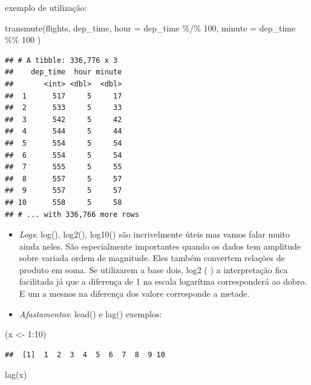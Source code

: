 \documentclass[
]{article}
\newenvironment{Shaded}{\begin{snugshade}}{\end{snugshade}}
\newcommand{\AttributeTok}[1]{\textcolor[rgb]{0.77,0.63,0.00}{#1}}
\newcommand{\DecValTok}[1]{\textcolor[rgb]{0.00,0.00,0.81}{#1}}
\newcommand{\FunctionTok}[1]{\textcolor[rgb]{0.00,0.00,0.00}{#1}}
\newcommand{\NormalTok}[1]{#1}
\newcommand{\OtherTok}[1]{\textcolor[rgb]{0.56,0.35,0.01}{#1}}
\newcommand{\SpecialCharTok}[1]{\textcolor[rgb]{0.00,0.00,0.00}{#1}}
\begin{document}
exemplo de utilização:

\begin{Shaded}
\begin{Highlighting}[]
\FunctionTok{transmute}\NormalTok{(flights,}
\NormalTok{  dep\_time,}
  \AttributeTok{hour =}\NormalTok{ dep\_time }\SpecialCharTok{\%/\%} \DecValTok{100}\NormalTok{,}
  \AttributeTok{minute =}\NormalTok{ dep\_time }\SpecialCharTok{\%\%} \DecValTok{100}
\NormalTok{)}
\end{Highlighting}
\end{Shaded}

\begin{verbatim}
## # A tibble: 336,776 x 3
##    dep_time  hour minute
##       <int> <dbl>  <dbl>
##  1      517     5     17
##  2      533     5     33
##  3      542     5     42
##  4      544     5     44
##  5      554     5     54
##  6      554     5     54
##  7      555     5     55
##  8      557     5     57
##  9      557     5     57
## 10      558     5     58
## # ... with 336,766 more rows
\end{verbatim}

\begin{itemize}
\item
  \emph{Logs}: log(), log2(), log10() são incrivelmente úteis mas vamos
  falar muito ainda neles. São especialmente importantes quando os dados
  tem amplitude sobre variada ordem de magnitude. Eles também convertem
  relações de produto em soma. Se utilizarem a base dois, log2 ( ) a
  interpretação fica facilitada já que a diferença de 1 na escala
  logarítma corresponderá ao dobro. E um a mesnos na diferença dos
  valore corresponde a metade.
\item
  \emph{Afastamentos}: lead() e lag() exemplos:
\end{itemize}

\begin{Shaded}
\begin{Highlighting}[]
\NormalTok{(x }\OtherTok{\textless{}{-}} \DecValTok{1}\SpecialCharTok{:}\DecValTok{10}\NormalTok{)}
\end{Highlighting}
\end{Shaded}

\begin{verbatim}
##  [1]  1  2  3  4  5  6  7  8  9 10
\end{verbatim}

\begin{Shaded}
\begin{Highlighting}[]
\FunctionTok{lag}\NormalTok{(x)}
\end{Highlighting}
\end{Shaded}
\end{document}

